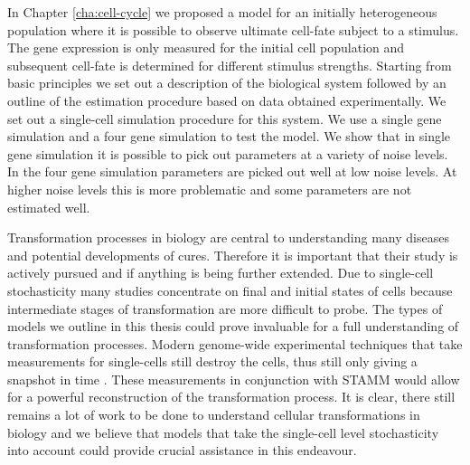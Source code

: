 In Chapter \ref{cha:cell-cycle} we proposed a model for an initially heterogeneous population where it is possible to observe ultimate cell-fate subject to a stimulus. The gene expression is only measured for the initial cell population and subsequent cell-fate is determined for different stimulus strengths. Starting from basic principles we set out a description of the biological system followed by an outline of the estimation procedure based on data obtained experimentally. We set out a single-cell simulation procedure for this system. We use a single gene simulation and a four gene simulation to test the model. We show that in single gene simulation it is possible to pick out parameters at a variety of noise levels. In the four gene simulation parameters are picked out well at low noise levels. At higher noise levels this is more problematic and some parameters are not estimated well.

Transformation processes in biology are central to understanding many diseases and potential developments of cures. Therefore it is important that their study is actively pursued and if anything is being further extended. Due to single-cell stochasticity many studies concentrate on final and initial states of cells because intermediate stages of transformation are more difficult to probe. The types of models we outline in this thesis could prove invaluable for a full understanding of transformation processes. Modern genome-wide experimental techniques that take measurements for single-cells still destroy the cells, thus still only giving a snapshot in time \citep{deSouza:2012dz}. These measurements in conjunction with STAMM would allow for a powerful reconstruction of the transformation process. It is clear, there still remains a lot of work to be done to understand cellular transformations in biology and we believe that models that take the single-cell level stochasticity into account could provide crucial assistance in this endeavour.

